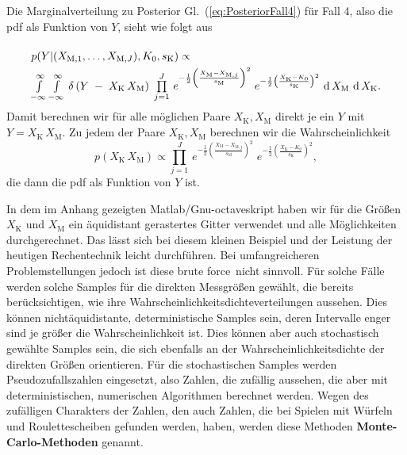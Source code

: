 Die Marginalverteilung zu Posterior Gl.~(\ref{eq:PosteriorFall4}) für Fall 4, also
die pdf als Funktion von $Y$, sieht wie folgt aus
\begin{equation}
\arraycolsep=2.0pt\def\arraystretch{2.0}
\begin{array}{l}
p(Y | (X_{\mathrm{M},1}, \dots, X_{\mathrm{M},J}), K_0, s_\mathrm{K}) \propto \\
\int\limits_{-\infty}^\infty \int\limits_{-\infty}^\infty \,
\delta \left( Y \; - \; X_\mathrm{K} \, X_\mathrm{M}\right)
\; \prod\limits_{j=1}^J  \,
e^{-\frac{1}{2} \left(\frac{ X_\mathrm{M} - X_{\mathrm{M},j} }{s_\mathrm{M}} \right)^2}
\;  e^{-\frac{1}{2} \left(\frac{X_\mathrm{K} - K_0}{s_\mathrm{K}} \right)^2}  \,
\operatorname{d}X_\mathrm{M} \, \operatorname{d}X_\mathrm{K}.
\end{array}
\label{marginalPosteriorFall4}
\end{equation}
Damit berechnen wir für alle möglichen Paare $X_\mathrm{K}, X_\mathrm{M}$ direkt je ein
$Y$ mit $Y = X_\mathrm{K} \, X_\mathrm{M}$. Zu jedem der Paare $X_\mathrm{K}, X_\mathrm{M}$
berechnen wir die Wahrscheinlichkeit
$$
p(X_\mathrm{K} \, X_\mathrm{M}) \propto \prod\limits_{j=1}^J  \,
e^{-\frac{1}{2} \left(\frac{ X_\mathrm{M} - X_{\mathrm{M},j} }{s_\mathrm{M}} \right)^2}
\;  e^{-\frac{1}{2} \left(\frac{X_\mathrm{K} - K_0}{s_\mathrm{K}} \right)^2},
$$
die dann die pdf als Funktion von $Y$ ist.

In dem im Anhang gezeigten Matlab/Gnu-octaveskript haben wir für die Größen
$X_\mathrm{K}$ und $X_\mathrm{M}$ ein äquidistant gerastertes Gitter verwendet und alle
Möglichkeiten durchgerechnet. Das lässt sich bei diesem kleinen Beispiel und der Leistung
der heutigen Rechentechnik leicht durchführen. Bei umfangreicheren Problemstellungen jedoch
ist diese \glqq brute force\grqq ~nicht sinnvoll. Für solche Fälle
werden solche Samples für die direkten Messgrößen
gewählt, die bereits berücksichtigen, wie ihre Wahrscheinlichkeitsdichteverteilungen aussehen.
Dies können nichtäquidistante, deterministische Samples sein, deren Intervalle enger sind
je größer die Wahrscheinlichkeit ist. Dies können aber auch stochastisch gewählte Samples sein,
die sich ebenfalls an der Wahrscheinlichkeitsdichte der direkten Größen orientieren.
Für die stochastischen Samples werden Pseudozufallszahlen eingesetzt, also Zahlen, die zufällig
aussehen, die aber mit deterministischen, numerischen Algorithmen berechnet werden.
Wegen des zufälligen Charakters der Zahlen, den auch Zahlen, die bei Spielen mit Würfeln und
Roulettescheiben gefunden werden, haben, werden diese Methoden \textbf{Monte-Carlo-Methoden}
genannt.


